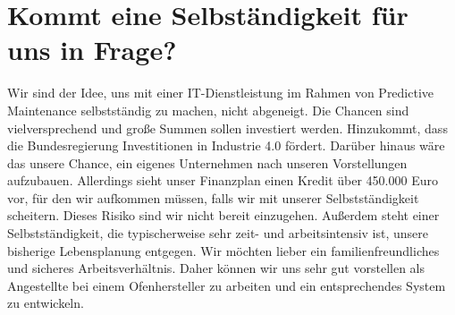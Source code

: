 \section{Kommt eine Selbständigkeit für uns in Frage?}
Wir sind der Idee, uns mit einer IT-Dienstleistung im Rahmen von Predictive Maintenance selbstständig zu machen, nicht abgeneigt. Die Chancen sind vielversprechend und große Summen sollen investiert werden. Hinzukommt, dass die Bundesregierung Investitionen in Industrie 4.0 fördert. Darüber hinaus wäre das unsere Chance, ein eigenes Unternehmen nach unseren Vorstellungen aufzubauen. Allerdings sieht unser Finanzplan einen Kredit über 450.000 Euro vor, für den wir aufkommen müssen, falls wir mit unserer Selbstständigkeit scheitern. Dieses Risiko sind wir nicht bereit einzugehen. Außerdem steht einer Selbstständigkeit, die typischerweise sehr zeit- und arbeitsintensiv ist, unsere bisherige Lebensplanung entgegen. Wir möchten lieber ein familienfreundliches und sicheres Arbeitsverhältnis. Daher können wir uns sehr gut vorstellen als Angestellte bei einem Ofenhersteller zu arbeiten und ein entsprechendes System zu entwickeln.